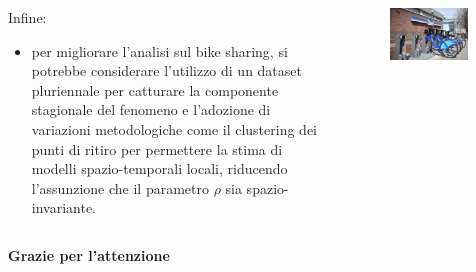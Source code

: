 \begin{frame}
	
	\begin{columns}
		\begin{column}{0.5\linewidth}
			Infine:
			\begin{itemize}
				\justifying
				\item per migliorare l'analisi sul bike sharing, si potrebbe considerare l'utilizzo di un dataset pluriennale per catturare la componente stagionale del fenomeno e l'adozione di variazioni metodologiche come il clustering dei punti di ritiro per permettere la stima di modelli spazio-temporali locali, riducendo l'assunzione che il parametro $\rho$ sia spazio-invariante.
			\end{itemize}
		\end{column}
	
		\begin{column}{0.5\linewidth}
			\centering
			\begin{figure}
				\includegraphics[width=0.95\textwidth]{../Tesi/Immagini/4. Caso di studio/Introduzione/Citi Bike}
			\end{figure}
		\end{column}
	\end{columns}

	\centering
	\vspace{25pt}
	\textbf{Grazie per l'attenzione}
\end{frame}